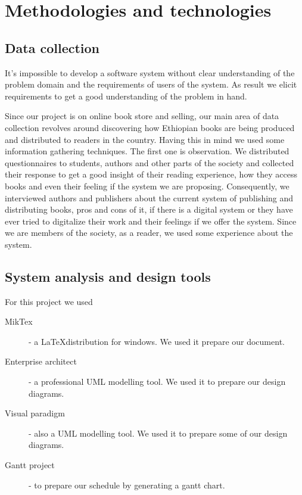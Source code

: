 	\section{Methodologies and technologies}
		\subsection{Data collection}

It's impossible to develop a software system without clear understanding of the problem domain and the requirements of users of the system. As result we elicit requirements to get a good understanding of the problem in hand.

Since our project is on online book store and selling, our main area of data collection revolves around discovering how Ethiopian books are being produced and distributed to readers in the country. Having this in mind we used some information gathering techniques. The first one is observation. We distributed questionnaires to students, authors and other parts of the society and collected their response to get a good insight of their reading experience, how they access books and even their feeling if the system we are proposing. Consequently, we interviewed authors and publishers about the current system of publishing and distributing books, pros and cons of it, if there is a digital system or they have ever tried to digitalize their work and their feelings if we offer the system. Since we are members of the society, as a reader, we used some experience about the system.

		\subsection{System analysis and design tools}

For this project we used 

\begin{description}
	\item[MikTex] - a \LaTeX distribution for windows. We used it prepare our document.
	\item[Enterprise architect] - a professional UML modelling tool. We used it to prepare our design diagrams.
	\item[Visual paradigm] - also a UML modelling tool. We used it to prepare some of our design diagrams.
	\item[Gantt project] - to prepare our schedule by generating a gantt chart.
\end{description}

